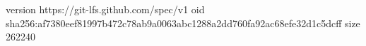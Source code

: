 version https://git-lfs.github.com/spec/v1
oid sha256:af7380eef81997b472c78ab9a0063abc1288a2dd760fa92ac68efe32d1c5dcff
size 262240
